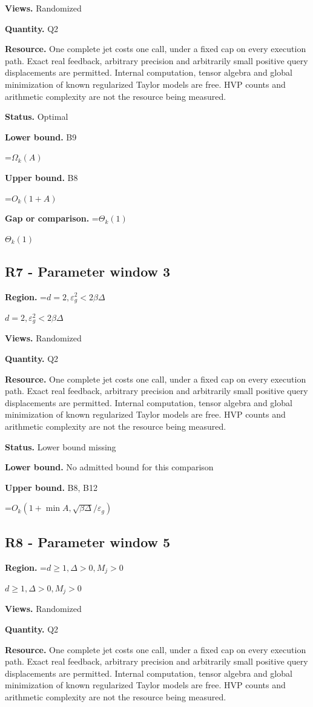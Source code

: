 \documentclass[10pt,a4paper]{article}
\newcommand{\AtlasMath}[1]{\par\begingroup\centering\setbox0=\hbox{$\displaystyle #1$}\ifdim\wd0>1.4\linewidth\typeout{ATLAS WIDE FORMULA: \the\wd0}\fi\ifdim\wd0>\linewidth\resizebox{\linewidth}{!}{\box0}\else\box0\fi\par\endgroup}
\newcommand{\AtlasInlineMath}[1]{\begingroup\setbox0=\hbox{$#1$}\ifdim\wd0>.4\linewidth\endgroup\AtlasMath{#1}\else\endgroup$#1$\fi}
\begin{document}
\textbf{Views.} Randomized

\textbf{Quantity.} Q2

\textbf{Resource.} One complete jet costs one call, under a fixed cap on every execution path. Exact real feedback, arbitrary precision and arbitrarily small positive query displacements are permitted. Internal computation, tensor algebra and global minimization of known regularized Taylor models are free. HVP counts and arithmetic complexity are not the resource being measured.

\textbf{Status.} Optimal

\textbf{Lower bound.} B9

\AtlasMath{\Omega_k(A)}
\textbf{Upper bound.} B8

\AtlasMath{O_k(1+A)}
\textbf{Gap or comparison.} \AtlasInlineMath{\Theta_k(1)}

\subsection{R7 - Parameter window 3}
\textbf{Region.} \AtlasInlineMath{d=2, \varepsilon_g^2<2\beta\Delta}

\textbf{Views.} Randomized

\textbf{Quantity.} Q2

\textbf{Resource.} One complete jet costs one call, under a fixed cap on every execution path. Exact real feedback, arbitrary precision and arbitrarily small positive query displacements are permitted. Internal computation, tensor algebra and global minimization of known regularized Taylor models are free. HVP counts and arithmetic complexity are not the resource being measured.

\textbf{Status.} Lower bound missing

\textbf{Lower bound.} No admitted bound for this comparison

\textbf{Upper bound.} B8, B12

\AtlasMath{O_k(1+\min{A,\sqrt{\beta\Delta}/\varepsilon_g})}
\subsection{R8 - Parameter window 5}
\textbf{Region.} \AtlasInlineMath{d\ge 1, \Delta>0, M_j>0}

\textbf{Views.} Randomized

\textbf{Quantity.} Q2

\textbf{Resource.} One complete jet costs one call, under a fixed cap on every execution path. Exact real feedback, arbitrary precision and arbitrarily small positive query displacements are permitted. Internal computation, tensor algebra and global minimization of known regularized Taylor models are free. HVP counts and arithmetic complexity are not the resource being measured.
\end{document}

